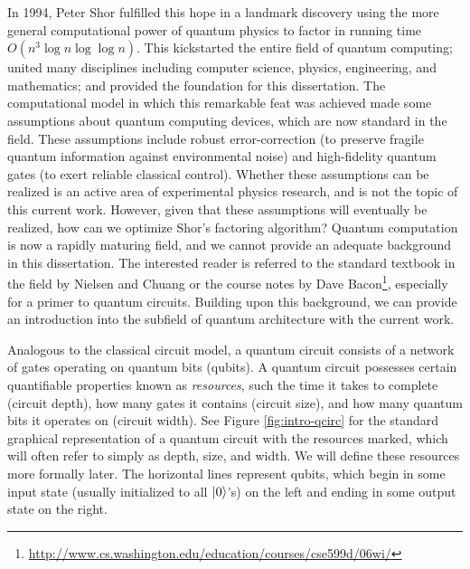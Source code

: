 In 1994, Peter Shor fulfilled this hope in a landmark
discovery using the more general computational power of quantum physics
to factor in running time $O(n^3\log n \log\log n)$\cite{Shor1994}. 
This kickstarted the entire field of quantum computing; united many
disciplines including computer science, physics, engineering, and
mathematics; and provided the foundation for this dissertation.
The computational model in which this remarkable feat was achieved
made some assumptions about quantum computing devices, which are now
standard in the field.
These assumptions include robust error-correction (to preserve fragile
quantum information against environmental noise) and high-fidelity
quantum gates (to exert reliable classical control).
Whether these assumptions can be
realized is an active area of experimental physics research, and is not the
topic of this current work. However, given that these assumptions will
eventually be realized, how can we optimize Shor's factoring algorithm?
Quantum computation is now a rapidly maturing field, and we cannot provide
an adequate background in this dissertation. The interested reader is referred
to the standard textbook in the field by Nielsen and Chuang \cite{Nielsen2000}
or the course notes by Dave Bacon\footnote{\url{http://www.cs.washington.edu/education/courses/cse599d/06wi/}},
especially for a primer to quantum circuits.
Building upon this background, we can provide an introduction into the subfield
of quantum architecture with the current work.

Analogous to the classical circuit model, a quantum circuit consists of
a network of gates operating on quantum bits (qubits). A quantum
circuit possesses certain quantifiable properties known as \emph{resources},
such the time it takes to complete (circuit depth), how many gates
it contains (circuit size), and how many quantum bits it operates on
(circuit width).
See Figure \ref{fig:intro-qcirc} for the standard graphical representation of
a quantum circuit with the resources marked, which will often refer to
simply as depth, size, and width.
We will define these resources more formally later.
The horizontal
lines represent qubits, which begin in some input state
(usually initialized to all $\left\vert{0}\right\rangle$'s) on the left and ending in some
output state on the right.

